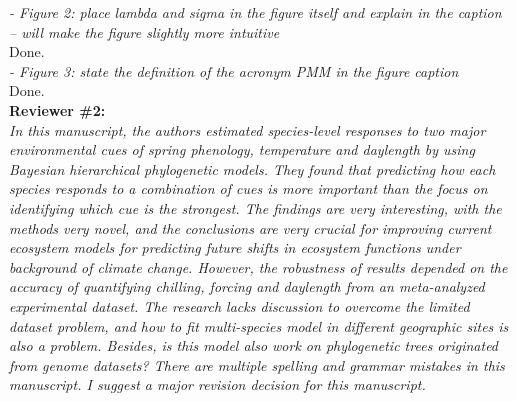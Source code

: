 \documentclass[11pt]{article}
\begin{document}
\emph{- Figure 2: place lambda and sigma in the figure itself and explain in the caption – will make the figure slightly more intuitive}\\
Done.\\

\emph{- Figure 3: state the definition of the acronym PMM in the figure caption}\\
Done.\\

{\bf Reviewer \#2:}\\


\emph{In this manuscript, the authors estimated species-level responses to two major environmental cues of spring phenology, temperature and daylength by using Bayesian hierarchical phylogenetic models. They found that predicting how each species responds to a combination of cues is more important than the focus on identifying which cue is the strongest. The findings are very interesting, with the methods very novel, and the conclusions are very crucial for improving current ecosystem models for predicting future shifts in ecosystem functions under background of climate change. However, the robustness of results depended on the accuracy of quantifying chilling, forcing and daylength from an meta-analyzed experimental dataset. The research lacks discussion to overcome the limited dataset problem, and how to fit multi-species model in different geographic sites is also a problem. Besides, is this model also work on phylogenetic trees originated from genome datasets? There are multiple spelling and grammar mistakes in this manuscript. I suggest a major revision decision for this manuscript.}\\

\end{document}

